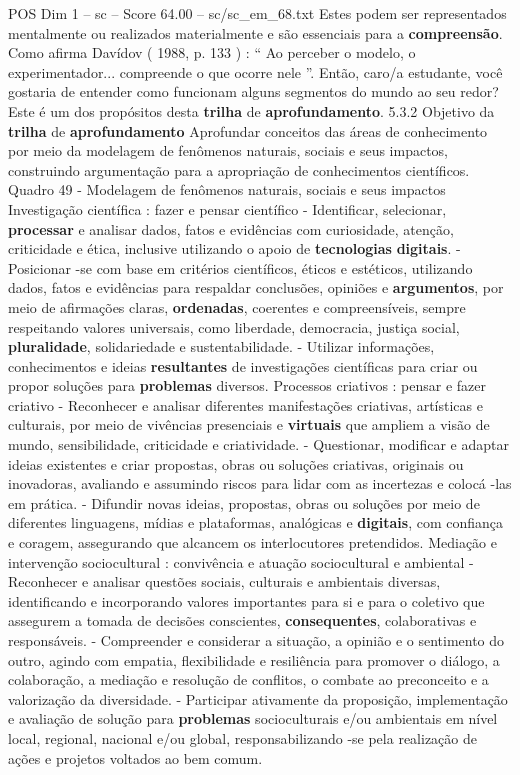\begin{textsample}{POS Dim 1 – sc – Score 64.00 – sc/sc\_em\_68.txt}
Estes podem ser representados mentalmente ou realizados materialmente e são essenciais para a \textbf{compreensão}.
Como afirma Davídov ( 1988, p. 133 ) : “ Ao perceber o modelo, o experimentador... compreende o que ocorre nele ”.
Então, caro/a estudante, você gostaria de entender como funcionam alguns segmentos do mundo ao seu redor?
Este é um dos propósitos desta \textbf{trilha} de \textbf{aprofundamento}. 5.3.2 Objetivo da \textbf{trilha} de \textbf{aprofundamento} Aprofundar conceitos das áreas de conhecimento por meio da modelagem de fenômenos naturais, sociais e seus impactos, construindo argumentação para a apropriação de conhecimentos científicos.
Quadro 49 - Modelagem de fenômenos naturais, sociais e seus impactos Investigação científica : fazer e pensar científico - Identificar, selecionar, \textbf{processar} e analisar dados, fatos e evidências com curiosidade, atenção, criticidade e ética, inclusive utilizando o apoio de \textbf{tecnologias} \textbf{digitais}. - Posicionar -se com base em critérios científicos, éticos e estéticos, utilizando dados, fatos e evidências para respaldar conclusões, opiniões e \textbf{argumentos}, por meio de afirmações claras, \textbf{ordenadas}, coerentes e compreensíveis, sempre respeitando valores universais, como liberdade, democracia, justiça social, \textbf{pluralidade}, solidariedade e sustentabilidade. - Utilizar informações, conhecimentos e ideias \textbf{resultantes} de investigações científicas para criar ou propor soluções para \textbf{problemas} diversos.
Processos criativos : pensar e fazer criativo - Reconhecer e analisar diferentes manifestações criativas, artísticas e culturais, por meio de vivências presenciais e \textbf{virtuais} que ampliem a visão de mundo, sensibilidade, criticidade e criatividade. - Questionar, modificar e adaptar ideias existentes e criar propostas, obras ou soluções criativas, originais ou inovadoras, avaliando e assumindo riscos para lidar com as incertezas e colocá -las em prática. - Difundir novas ideias, propostas, obras ou soluções por meio de diferentes linguagens, mídias e plataformas, analógicas e \textbf{digitais}, com confiança e coragem, assegurando que alcancem os interlocutores pretendidos.
Mediação e intervenção sociocultural : convivência e atuação sociocultural e ambiental - Reconhecer e analisar questões sociais, culturais e ambientais diversas, identificando e incorporando valores importantes para si e para o coletivo que assegurem a tomada de decisões conscientes, \textbf{consequentes}, colaborativas e responsáveis. - Compreender e considerar a situação, a opinião e o sentimento do outro, agindo com empatia, flexibilidade e resiliência para promover o diálogo, a colaboração, a mediação e resolução de conflitos, o combate ao preconceito e a valorização da diversidade. - Participar ativamente da proposição, implementação e avaliação de solução para \textbf{problemas} socioculturais e/ou ambientais em nível local, regional, nacional e/ou global, responsabilizando -se pela realização de ações e projetos voltados ao bem comum.

\end{textsample}
